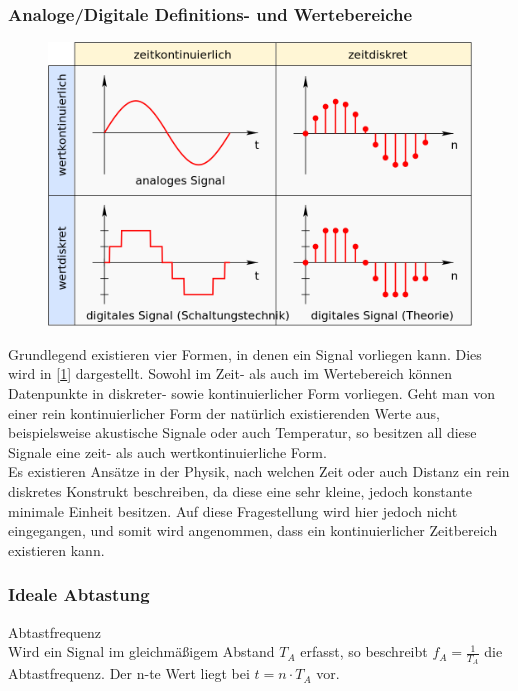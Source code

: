 \subsubsection{Analoge/Digitale Definitions- und Wertebereiche}
\begin{figure}
\centering
\includegraphics[scale=0.3]{images/signals.png}
\label{signals}
\end{figure}
Grundlegend existieren vier Formen, in denen ein Signal vorliegen kann. Dies wird in [\ref{signals}] dargestellt. Sowohl im Zeit- als auch im Wertebereich können Datenpunkte in diskreter- sowie kontinuierlicher Form vorliegen. Geht man von einer rein kontinuierlicher Form der natürlich existierenden Werte aus, beispielsweise akustische Signale oder auch Temperatur, so besitzen all diese Signale eine zeit- als auch wertkontinuierliche Form.\\
Es existieren Ansätze in der Physik, nach welchen Zeit oder auch Distanz ein rein diskretes Konstrukt beschreiben, da diese eine sehr kleine, jedoch konstante minimale Einheit besitzen. Auf diese Fragestellung wird hier jedoch nicht eingegangen, und somit wird angenommen, dass ein kontinuierlicher Zeitbereich existieren kann.\\
\newpage

\subsubsection{Ideale Abtastung}
\begin{definition}{Abtastfrequenz}\\
Wird ein Signal im gleichmäßigem Abstand $T_A$ erfasst, so beschreibt $f_A = \frac{1}{T_A}$ die Abtastfrequenz. Der n-te Wert liegt bei $t = n \cdot T_A$ vor.
\end{definition}

